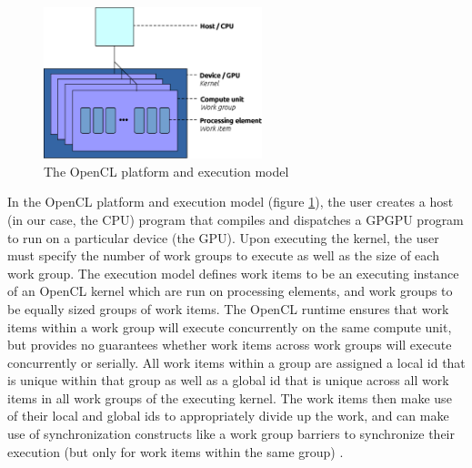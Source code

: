 \documentclass[conference,10pt]{IEEEtran}
\begin{document}
\begin{figure}[!t]
\centering
\includegraphics[width=2.5in]{resource/opencl_model.eps}
\caption{The OpenCL platform and execution model}
\label{fig:opencl}
\end{figure}

In the OpenCL platform and execution model (figure \ref{fig:opencl}), the user creates a host (in 
our case, the CPU) program that compiles and dispatches a GPGPU program to run on a particular 
device (the GPU).  Upon executing the kernel, the user must specify the number of work groups to 
execute as well as the size of each work group.  The execution model defines work items to be an 
executing instance of an OpenCL kernel which are run on processing elements, and work groups to be 
equally sized groups of work items. The OpenCL runtime ensures that work items within a work group 
will execute concurrently on the same compute unit, but provides no guarantees whether work items 
across work groups will execute concurrently or serially. All work items within a group are assigned 
a local id that is unique within that group as well as a global id that is unique across all work 
items in all work groups of the executing kernel.  The work items then make use of their local and 
global ids to appropriately divide up the work, and can make use of synchronization constructs like 
a work group barriers to synchronize their execution (but only for work items within the same group) 
\cite{opencl_guide}.

%
%
\end{document}
